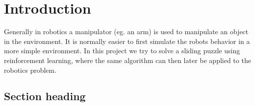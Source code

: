 \graphicspath{{introduction/fig/}}

\chapter{Introduction}
\label{chap:introduction}

Generally in robotics a manipulator (eg.
an arm) is used to manipulate an object in
the environment. It is normally easier to
first simulate the robots behavior in a
more simple environment. In this project
we try to solve a sliding puzzle using
reinforcement learning, where the same
algorithm can then later be applied to the
robotics problem.

\section{Section heading}
